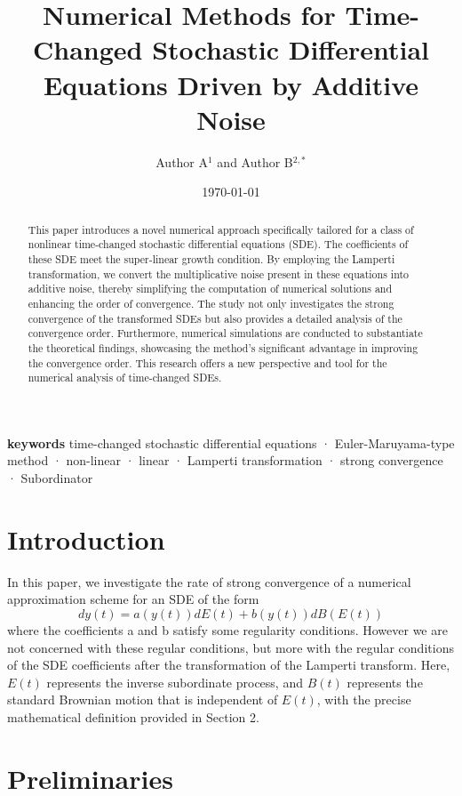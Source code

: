 \documentclass[10pt,reqno,final]{amsart}
\title[Short Title]{Numerical Methods for Time-Changed Stochastic Differential Equations Driven by Additive Noise
}
\author[Author A and Author B]{Author A${}^{1}$ and Author B${}^{2,*}$}
\date{\today}
\theoremstyle{plain}
\theoremstyle{definition}
\theoremstyle{remark}
\numberwithin{equation}{section}
\numberwithin{figure}{section}
\numberwithin{table}{section}
\begin{document}
\begin{abstract}
	
This paper introduces a novel numerical approach specifically tailored for a class of nonlinear time-changed stochastic differential equations (SDE). The coefficients of these SDE meet the super-linear growth condition. By employing the Lamperti transformation, we convert the multiplicative noise present in these equations into additive noise, thereby simplifying the computation of numerical solutions and enhancing the order of convergence. The study not only investigates the strong convergence of the transformed SDEs but also provides a detailed analysis of the convergence order. Furthermore, numerical simulations are conducted to substantiate the theoretical findings, showcasing the method's significant advantage in improving the convergence order. This research offers a new perspective and tool for the numerical analysis of time-changed SDEs.


\end{abstract}


\maketitle

\textbf{keywords} time-changed stochastic differential equations · Euler-Maruyama-type method · non-linear · linear · Lamperti transformation · strong convergence ·  Subordinator

\section{Introduction}

In this paper, we investigate the rate of strong convergence of a numerical approximation scheme for an SDE of the form
\begin{equation}\label{original SDE}
	dy(t)=a(y(t))dE(t)+b(y(t))dB(E(t))
\end{equation}
where the coeﬃcients a and b satisfy some regularity conditions. However we are not concerned with these regular conditions, but more with the regular conditions of the SDE coefficients after the transformation of the Lamperti transform.
Here, $E(t)$ represents the inverse subordinate process, and $B(t)$ represents the standard Brownian motion that is independent of $E(t)$, with the precise mathematical definition provided in Section 2.

\section{Preliminaries}
\end{document}
